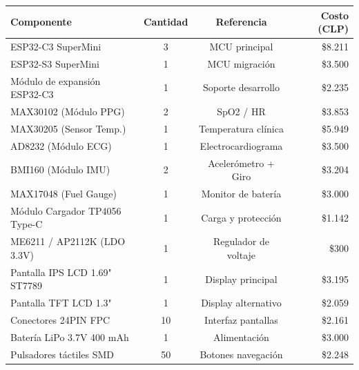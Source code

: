 \documentclass[letterpaper,11pt]{article}
\begin{document}
\begin{table}[H]
    \centering
    \renewcommand{\arraystretch}{1.3}
    \begin{tabular}{|l|c|c|r|}
        \hline
        \rowcolor[HTML]{E5E7E9}
        \textbf{Componente}           & \textbf{Cantidad} & \textbf{Referencia}  & \textbf{Costo (CLP)} \\ \hline
        ESP32-C3 SuperMini            & 3                 & MCU principal        & \$8.211              \\ \hline
        ESP32-S3 SuperMini            & 1                 & MCU migración        & \$3.500              \\ \hline
        Módulo de expansión ESP32-C3  & 1                 & Soporte desarrollo   & \$2.235              \\ \hline
        MAX30102 (Módulo PPG)         & 2                 & SpO2 / HR            & \$3.853              \\ \hline
        MAX30205 (Sensor Temp.)       & 1                 & Temperatura clínica  & \$5.949              \\ \hline
        AD8232 (Módulo ECG)           & 1                 & Electrocardiograma   & \$3.500              \\ \hline
        BMI160 (Módulo IMU)           & 2                 & Acelerómetro + Giro  & \$3.204              \\ \hline
        MAX17048 (Fuel Gauge)         & 1                 & Monitor de batería   & \$3.000              \\ \hline
        Módulo Cargador TP4056 Type-C & 1                 & Carga y protección   & \$1.142              \\ \hline
        ME6211 / AP2112K (LDO 3.3V)   & 1                 & Regulador de voltaje & \$300                \\ \hline
        Pantalla IPS LCD 1.69" ST7789 & 1                 & Display principal    & \$3.195              \\ \hline
        Pantalla TFT LCD 1.3"         & 1                 & Display alternativo  & \$2.059              \\ \hline
        Conectores 24PIN FPC          & 10                & Interfaz pantallas   & \$2.161              \\ \hline
        Batería LiPo 3.7V 400 mAh     & 1                 & Alimentación         & \$3.000              \\ \hline
        Pulsadores táctiles SMD       & 50                & Botones navegación   & \$2.248              \\ \hline

\end{tabular}
\end{table}
\end{document}

